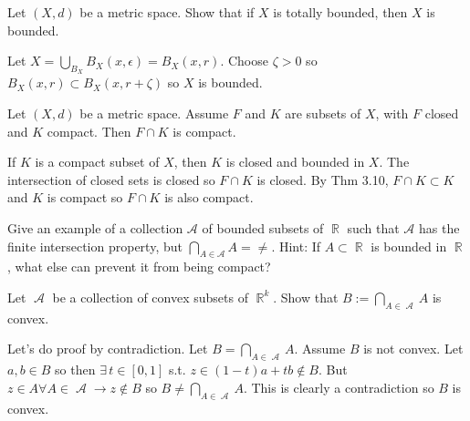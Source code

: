 \documentclass[12pt,letterpaper,boxed]{hmcpset}
\DeclareMathOperator{\A}{\mathcal{A}}
\DeclareMathOperator{\R}{\mathbb{R}}
\begin{document}

\begin{problem}[Exercise 2.24]
Let $(X, d)$ be a metric space. Show that if $X$ is totally bounded, then $X$ is bounded.
\end{problem}

\begin{solution}
Let $X = \bigcup_{B_X} B_X(x , \epsilon) = B_X(x,r)$. Choose $\zeta > 0$ so $B_X(x,r)\subset B_X(x, r + \zeta)$ so $X$ is bounded. 
\end{solution}

\begin{problem}[Exercise 3.12]
Let $(X, d)$ be a metric space. Assume $F$ and $K$ are subsets of $X$, with $F$ closed and $K$ compact. Then $F\cap K$ is compact.
\end{problem}

\begin{solution}
If $K$ is a compact subset of $X$, then $K$ is closed and bounded in $X$. The intersection of closed sets is closed so $F\cap K$ is closed. By Thm 3.10, $F \cap K \subset K$ and $K$ is compact so $F \cap K$ is also compact.
\end{solution}

\begin{problem}[Exercise 3.26]
Give an example of a collection $\mathcal{A}$ of bounded subsets of $\R$ such that $\mathcal{A}$ has the finite intersection property, but $\bigcap_{A \in \mathcal{A}} A = \neq$. Hint: If $A \subset \R$ is bounded in $\R$, what else can prevent it from being compact?
\end{problem}

\begin{solution}

\end{solution}

\begin{problem}[Exercise 5.3]
Let $\A$ be a collection of convex subsets of $\R^{k}.$ Show that $B := \bigcap_{A \in \A} A$ is convex. 
\end{problem}

\begin{solution}
Let's do proof by contradiction. Let $B=\bigcap_{A \in \A} A$. Assume $B$ is not convex. Let $a, b \in B$ so then $\exists \, t\in [0, 1]$ s.t. $z \in (1 - t)a + tb \notin B$. But $z \in A \forall A \in \A \rightarrow z \notin B$ so $B \neq \bigcap_{A \in \A} A.$ This is clearly a contradiction so $B$ is convex.
\end{solution}
\end{document}
